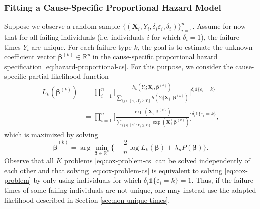 \documentclass[11pt]{article}
\newcommand{\R}{\mathbb{R}}
\newcommand{\X}{\mathbf{X}}
\renewcommand{\b}{\bm{\beta}}
\newcommand{\indic}{\mathds{1}}
\begin{document}
\subsubsection{Fitting a Cause-Specific Proportional Hazard Model}
Suppose we observe a random sample  $\big\{ (\X_i, Y_i, \delta_i\varepsilon_i, \delta_i) \big\}_{i=1}^n$. Assume for now that for all failing individuals (i.e. individuals $i$ for which $\delta_i = 1$), the failure times $Y_i$ are unique. For each failure type $k$, the goal is to estimate the unknown coefficient vector $\b^{(k)}\in\R^p$ in the cause-specific proportional hazard specification \eqref{eq:hazard-proportional-cs}. For this purpose, we consider the cause-specific partial likelihood function
\begin{equation*} %
    \begin{split}
        L_k\left(\b^{(k)}\right)
        &=
        \prod_{i=1}^n
        \Bigg[
        \frac{ h_k(Y_i ; \X_i, \b^{(k)}) }{ \sum_{\{ j\in[n] : Y_j \geq Y_i \}} h(Y_i | \X_j, \b^{(k)}) }
        \Bigg]^{\delta_i \indic\{ \varepsilon_i = k \}}
        \\
        &=
        \prod_{i=1}^n
        \Bigg[
        \frac{ \exp(\X_i^\top \b^{(k)}) }{ \sum_{\{ j\in[n] : Y_j \geq Y_i \}} \exp(\X_j^\top \b^{(k)}) }\Bigg]^{\delta_i \indic\{\varepsilon_i = k\}},
    \end{split}
\end{equation*}
which is maximized by solving
\begin{equation} \label{eq:cox-problem-cs}
	\widehat{\b}^{(k)} = \arg\min_{\b\in\R^p} 
	\bigg\{ 
		-\frac{2}{n} \log L_k(\b) + \lambda_n P(\b)
	\bigg\}.
\end{equation}
Observe that all $K$ problems \eqref{eq:cox-problem-cs} can be solved independently of each other and that solving \eqref{eq:cox-problem-cs} is equivalent to solving \eqref{eq:cox-problem} by only using individuals for which $\delta_i \indic\{ \varepsilon_i = k \} = 1$. Thus, if the failure times of some failing individuals are not unique, one may instead use the adapted likelihood described in Section \ref{sec:non-unique-times}.
\end{document}

